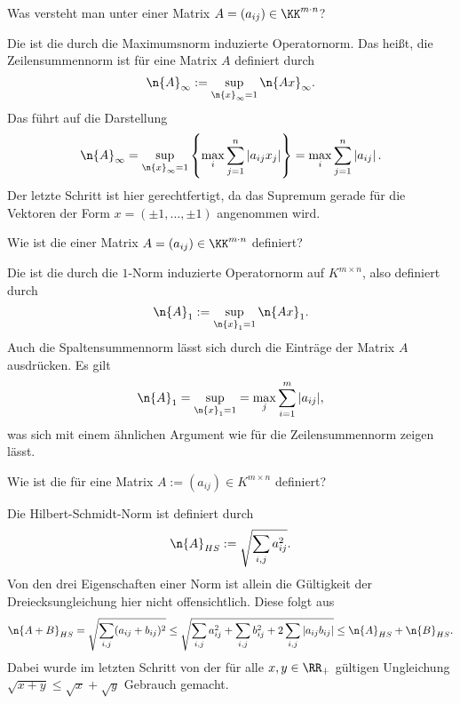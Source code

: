 \begin{frage}
  Was versteht man unter 
  einer Matrix $A=(a_{ij})\in \KK^{m \cdot n}$?
\end{frage}

\begin{antwort}
  Die  ist die durch die Maximumsnorm 
  induzierte Operatornorm. Das heißt, die Zeilensummennorm 
  ist für eine Matrix $A$ definiert durch
  \[
  \n{ A }_\infty := \sup_{\n{ x }_\infty=1} \n{ Ax }_\infty.
  \]
  Das führt auf die Darstellung
  \[
  \n{ A }_\infty = \sup_{\n{ x }_\infty=1} 
  \left\{ \max_i \sum_{j=1}^n \left| a_{ij} x_j \right| \right\} = 
  \max_i \sum_{j=1}^n \left| a_{ij} \right|.
  \]
  Der letzte Schritt ist hier gerechtfertigt, da das Supremum gerade für 
  die Vektoren der Form $x=(\pm 1, \ldots, \pm 1)$ angenommen wird. 
  \AntEnd
\end{antwort} 

\begin{frage}
  Wie ist die   
  einer Matrix $A=(a_{ij})\in \KK^{m \cdot n}$ definiert?
\end{frage}

\begin{antwort}
  Die  ist die 
  durch die $1$-Norm induzierte Operatornorm auf $K^{m\times n}$, also 
  definiert durch
  \[
  \n{ A }_1 := \sup_{\n{ x }_1=1} \n{ Ax }_1.
  \]
  Auch die Spaltensummennorm lässt sich durch die Einträge der 
  Matrix $A$ ausdrücken. Es gilt
  \[
  \n{ A }_1 = \sup_{\n{ x }_1=1} = \max_{j} \sum_{i=1}^m | a_{ij} |,
  \]
  was sich mit einem ähnlichen Argument wie für die Zeilensummennorm zeigen 
  lässt.
  \AntEnd
\end{antwort} 

\begin{frage}
  Wie ist die  für eine Matrix 
  $A:= (a_{ij}) \in K^{m\times n}$ definiert?
\end{frage}


\begin{antwort}
  Die Hilbert-Schmidt-Norm ist definiert durch
  \[
  \n{ A }_{HS} := \sqrt{ \sum_{i,j}  a_{ij}^2  }.
  \]
  Von den drei Eigenschaften einer Norm ist allein die Gültigkeit 
  der Dreiecksungleichung hier nicht offensichtlich.
  Diese folgt aus 
  \[ 
  \n{ A+B }_{HS} = \sqrt{ \sum_{i,j} (a_{ij}+b_{ij} )^2 } \le 
  \sqrt{ \sum_{i,j} a^2_{ij} + \sum_{i,j} b^2_{ij} + 
    2 \sum_{i,j}  \left| a_{ij}b_{ij} \right| } \le 
  \n{A}_{HS} + \n{B}_{HS}.
  \]
  Dabei wurde im letzten Schritt von der für alle 
  $x,y \in \RR_+$ gültigen Ungleichung 
  $\sqrt{x+y} \le \sqrt{x}+\sqrt{y}$ Gebrauch gemacht.
  \AntEnd 
\end{antwort}


